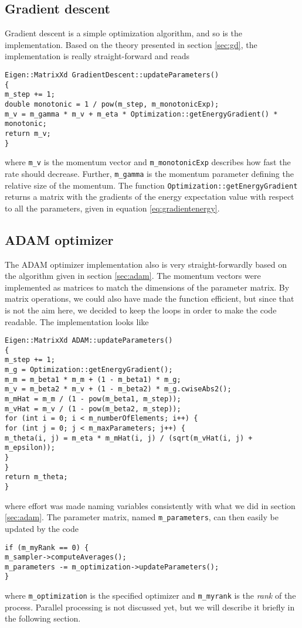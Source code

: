 \subsection{Gradient descent}
Gradient descent is a simple optimization algorithm, and so is the implementation. Based on the theory presented in section \ref{sec:gd}, the implementation is really straight-forward and reads
\begin{lstlisting}
Eigen::MatrixXd GradientDescent::updateParameters()
{
m_step += 1;
double monotonic = 1 / pow(m_step, m_monotonicExp);
m_v = m_gamma * m_v + m_eta * Optimization::getEnergyGradient() * monotonic;
return m_v;
}
\end{lstlisting}
where \lstinline|m_v| is the momentum vector and \lstinline|m_monotonicExp| describes how fast the rate should decrease. Further, \lstinline|m_gamma| is the momentum parameter defining the relative size of the momentum. The function \lstinline|Optimization::getEnergyGradient| returns a matrix with the gradients of the energy expectation value with respect to all the parameters, given in equation \eqref{eq:gradientenergy}.

\subsection{ADAM optimizer}
The ADAM optimizer implementation also is very straight-forwardly based on the algorithm given in section \ref{sec:adam}. The momentum vectors were implemented as matrices to match the dimensions of the parameter matrix. By matrix operations, we could also have made the function efficient, but since that is not the aim here, we decided to keep the loops in order to make the code readable. The implementation looks like
\begin{lstlisting}
Eigen::MatrixXd ADAM::updateParameters()
{
m_step += 1;
m_g = Optimization::getEnergyGradient();
m_m = m_beta1 * m_m + (1 - m_beta1) * m_g;
m_v = m_beta2 * m_v + (1 - m_beta2) * m_g.cwiseAbs2();
m_mHat = m_m / (1 - pow(m_beta1, m_step));
m_vHat = m_v / (1 - pow(m_beta2, m_step));
for (int i = 0; i < m_numberOfElements; i++) {
for (int j = 0; j < m_maxParameters; j++) {
m_theta(i, j) = m_eta * m_mHat(i, j) / (sqrt(m_vHat(i, j) + m_epsilon));
}
}
return m_theta;
}
\end{lstlisting}
where effort was made naming variables consistently with what we did in section \ref{sec:adam}. The parameter matrix, named \lstinline|m_parameters|, can then easily be updated by the code
\begin{lstlisting}
if (m_myRank == 0) {
m_sampler->computeAverages();
m_parameters -= m_optimization->updateParameters();
}
\end{lstlisting}
where \lstinline|m_optimization| is the specified optimizer and \lstinline|m_myrank| is the \textit{rank} of the process. Parallel processing is not discussed yet, but we will describe it briefly in the following section.

